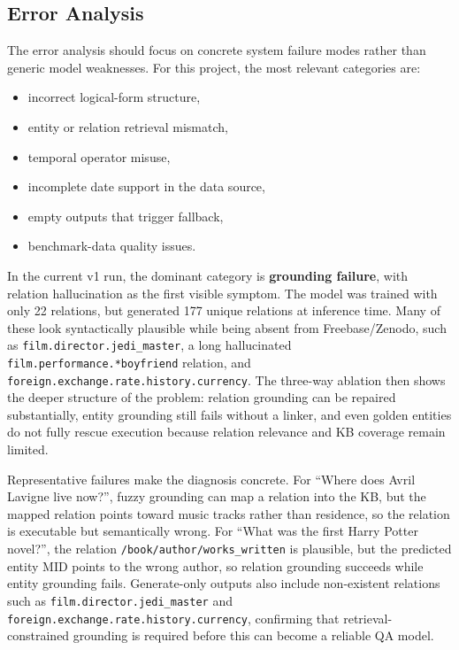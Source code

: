 \documentclass[a4paper,11pt]{article}
\begin{document}
\subsection{Error Analysis}

The error analysis should focus on concrete system failure modes rather than generic model weaknesses. For this project, the most relevant categories are:

\begin{itemize}[leftmargin=1.2cm]
  \item incorrect logical-form structure,
  \item entity or relation retrieval mismatch,
  \item temporal operator misuse,
  \item incomplete date support in the data source,
  \item empty outputs that trigger fallback,
  \item benchmark-data quality issues.
\end{itemize}

\noindent In the current v1 run, the dominant category is \textbf{grounding failure}, with relation hallucination as the first visible symptom. The model was trained with only 22 relations, but generated 177 unique relations at inference time. Many of these look syntactically plausible while being absent from Freebase/Zenodo, such as \texttt{film.director.jedi\_master}, a long hallucinated \texttt{film.performance.*boyfriend} relation, and \texttt{foreign.exchange.rate.history.currency}. The three-way ablation then shows the deeper structure of the problem: relation grounding can be repaired substantially, entity grounding still fails without a linker, and even golden entities do not fully rescue execution because relation relevance and KB coverage remain limited.

Representative failures make the diagnosis concrete. For ``Where does Avril Lavigne live now?'', fuzzy grounding can map a relation into the KB, but the mapped relation points toward music tracks rather than residence, so the relation is executable but semantically wrong. For ``What was the first Harry Potter novel?'', the relation \texttt{/book/author/works\_written} is plausible, but the predicted entity MID points to the wrong author, so relation grounding succeeds while entity grounding fails. Generate-only outputs also include non-existent relations such as \texttt{film.director.jedi\_master} and \texttt{foreign.exchange.rate.history.currency}, confirming that retrieval-constrained grounding is required before this can become a reliable QA model.
\end{document}
